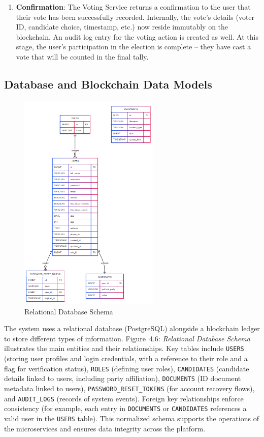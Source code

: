 \documentclass[a4paper,10pt]{report}
\begin{document}
\begin{enumerate}
    \item \textbf{Confirmation}: The Voting Service returns a confirmation to the user that their vote has been successfully recorded. Internally, the vote’s details (voter ID, candidate choice, timestamp, etc.) now reside immutably on the blockchain. An audit log entry for the voting action is created as well. At this stage, the user’s participation in the election is complete – they have cast a vote that will be counted in the final tally.
\end{enumerate}

\subsection{Database and Blockchain Data Models}
\begin{figure}[H]
  \centering
  \includegraphics[width=0.6\textwidth]{relationalDatabase.PNG}
  \caption{Relational Database Schema}
  \label{fig:full}
\end{figure}

The system uses a relational database (PostgreSQL) alongside a blockchain ledger to store different types of information. Figure~4.6: \emph{Relational Database Schema} illustrates the main entities and their relationships. Key tables include \texttt{USERS} (storing user profiles and login credentials, with a reference to their role and a flag for verification status), \texttt{ROLES} (defining user roles), \texttt{CANDIDATES} (candidate details linked to users, including party affiliation), \texttt{DOCUMENTS} (ID document metadata linked to users), \texttt{PASSWORD\_RESET\_TOKENS} (for account recovery flows), and \texttt{AUDIT\_LOGS} (records of system events). Foreign key relationships enforce consistency (for example, each entry in \texttt{DOCUMENTS} or \texttt{CANDIDATES} references a valid user in the \texttt{USERS} table). This normalized schema supports the operations of the microservices and ensures data integrity across the platform.
\end{document}
